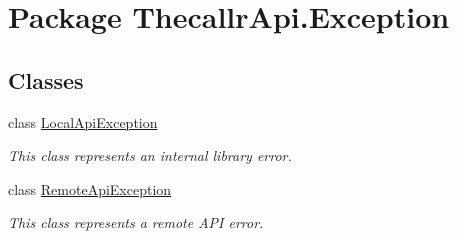 \hypertarget{namespace_thecallr_api_1_1_exception}{\section{Package Thecallr\+Api.\+Exception}
\label{namespace_thecallr_api_1_1_exception}
}
\subsection*{Classes}
\begin{DoxyCompactItemize}
\item 
class \hyperlink{class_thecallr_api_1_1_exception_1_1_local_api_exception}{Local\+Api\+Exception}
\begin{DoxyCompactList}\small\item\em This class represents an internal library error. \end{DoxyCompactList}\item 
class \hyperlink{class_thecallr_api_1_1_exception_1_1_remote_api_exception}{Remote\+Api\+Exception}
\begin{DoxyCompactList}\small\item\em This class represents a remote A\+P\+I error. \end{DoxyCompactList}\end{DoxyCompactItemize}
